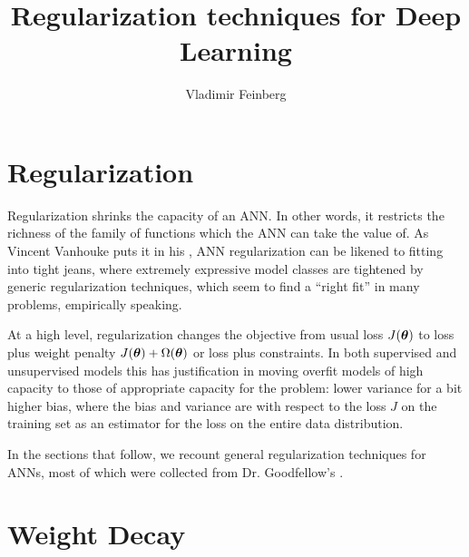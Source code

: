 \documentclass{article}
\title{Regularization techniques for Deep Learning}
\author{Vladimir Feinberg}
\begin{document}
\maketitle

\section{Regularization}

Regularization shrinks the capacity of an ANN. In other words, it restricts the richness of the family of functions which the ANN can take the value of. As Vincent Vanhouke puts it in his , ANN regularization can be likened to fitting into tight jeans, where extremely expressive model classes are tightened by generic regularization techniques, which seem to find a ``right fit'' in many problems, empirically speaking.

At a high level, regularization changes the objective from usual loss $J({\boldsymbol\theta})$ to loss plus weight penalty $J({\boldsymbol\theta})+\Omega({\boldsymbol\theta})$ or loss plus constraints. In both supervised and unsupervised models this has justification in moving overfit models of high capacity to those of appropriate capacity for the problem: lower variance for a bit higher bias, where the bias and variance are with respect to the loss $J$ on the training set as an estimator for the loss on the entire data distribution.

In the sections that follow, we recount general regularization techniques for ANNs, most of which were collected from Dr. Goodfellow's .

\section{Weight Decay}
\end{document}
